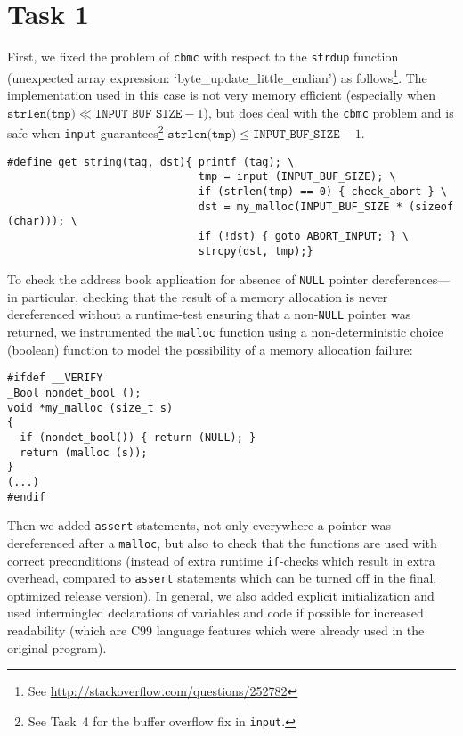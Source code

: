 \section*{Task 1}
First, we fixed the problem of \texttt{cbmc} with respect to the \texttt{strdup} function (unexpected array expression: `byte\_update\_little\_endian') as follows\footnote{See \url{http://stackoverflow.com/questions/252782}}. The implementation used in this case is not very memory efficient (especially when $\texttt{strlen(tmp)} \ll \texttt{INPUT\_BUF\_SIZE} - 1$), but does deal with the \texttt{cbmc} problem and is safe when \texttt{input} guarantees\footnote{See Task~4 for the buffer overflow fix in \texttt{input}.} $\texttt{strlen(tmp)} \leq \texttt{INPUT\_BUF\_SIZE} - 1$.


\begin{lstlisting}
#define get_string(tag, dst){ printf (tag); \
                              tmp = input (INPUT_BUF_SIZE); \
                              if (strlen(tmp) == 0) { check_abort } \
                              dst = my_malloc(INPUT_BUF_SIZE * (sizeof (char))); \
                              if (!dst) { goto ABORT_INPUT; } \
                              strcpy(dst, tmp);}
\end{lstlisting}

To check the address book application for absence of \texttt{NULL} pointer dereferences---in particular, checking that the result of a memory allocation is never dereferenced without a runtime-test ensuring that a non-\texttt{NULL} pointer was returned, we instrumented the \texttt{malloc} function using a non-deterministic choice (boolean) function to model the possibility of a memory allocation failure:

\begin{lstlisting}
#ifdef __VERIFY
_Bool nondet_bool ();
void *my_malloc (size_t s)
{
  if (nondet_bool()) { return (NULL); }
  return (malloc (s)); 
}
(...)
#endif
\end{lstlisting}

Then we added \texttt{assert} statements, not only everywhere a pointer was dereferenced after a \texttt{malloc}, but also to check that the functions are used with correct preconditions (instead of extra runtime \texttt{if}-checks which result in extra overhead, compared to \texttt{assert} statements which can be turned off in the final, optimized release version). In general, we also added explicit initialization and used intermingled declarations of variables and code if possible for increased readability (which are C99 language features which were already used in the original program).

